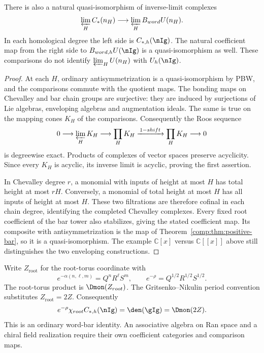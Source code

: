 \begin{proposition}
\label{comp:prop:lie-quotient-bar}
There is also a natural quasi-isomorphism of inverse-limit complexes
\[
 \varprojlim_H C_*(\mathfrak n_H)
       \longrightarrow
 \varprojlim_H B_{\mathrm{word}}U(\mathfrak n_H).
\]
In each homological degree the left side is
\(\widehat C_{*,h}(\nIg)\). The natural coefficient map from
the right side to \(\widehat B_{\mathrm{word},h}U(\nIg)\)
is a quasi-isomorphism as well. These comparisons do not identify
\(\varprojlim_HU(\mathfrak n_H)\) with \(\widehat U_h(\nIg)\).
\end{proposition}
\begin{proof}
At each \(H\), ordinary antisymmetrization is a quasi-isomorphism
by PBW, and the comparisons commute with the quotient maps. The
bonding maps on Chevalley and bar chain groups are surjective:
they are induced by surjections of Lie algebras, enveloping
algebras and augmentation ideals. The same is true on the mapping
cones \(K_H\) of the comparisons. Consequently the Roos sequence
\[
 0\longrightarrow\varprojlim_HK_H\longrightarrow
 \prod_HK_H\xrightarrow{\,1-\mathrm{shift}\,}\prod_HK_H
 \longrightarrow0
\]
is degreewise exact. Products of complexes of vector spaces preserve
acyclicity. Since every \(K_H\) is acyclic, its inverse limit
is acyclic, proving the first assertion.

In Chevalley degree \(r\), a monomial with inputs of height at
most \(H\) has total height at most \(rH\). Conversely, a
monomial of total height at most \(H\) has all inputs of height
at most \(H\). These two filtrations are therefore cofinal in
each chain degree, identifying the completed Chevalley complexes.
Every fixed root coefficient of the bar tower also stabilizes,
giving the stated coefficient map. Its composite with
antisymmetrization is the map of
Theorem~\ref{comp:thm:positive-bar}, so it is a quasi-isomorphism.
The example \(\mathbb C[x]\) versus \(\mathbb C[[x]]\) above
still distinguishes the two enveloping constructions.
\end{proof}

Write \(Z_{\mathrm{root}}\) for the root-torus coordinate with
\[
 e^{-\alpha(n,\ell,m)}=Q^nR^\ell S^m,
 \qquad e^{-\rho}=Q^{1/2}R^{1/2}S^{1/2}.
\]
The root-torus product is \(\Dmon(Z_{\mathrm{root}})\).
The Gritsenko--Nikulin period convention substitutes
\(Z_{\mathrm{root}}=2Z\). Consequently
\[
 e^{-\rho}\chi_{\mathrm{root}}\widehat C_{*,h}(\nIg)
 =\den(\gIg)=\Dmon(2Z).
\]
This is an ordinary word-bar identity. An associative algebra on
Ran space and a chiral field realization require their own
coefficient categories and comparison maps.

